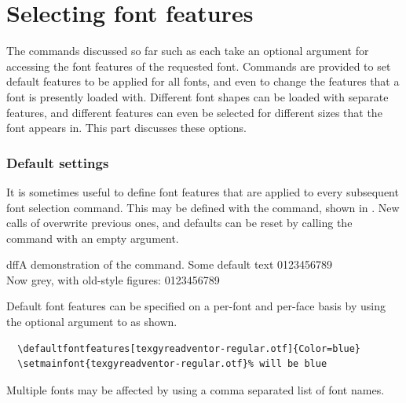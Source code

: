 \documentclass[a4paper]{l3doc}
\begin{document}
\part{Selecting font features}
\label{sec:selectingfeature}

The commands discussed so far such as  each take an optional argument for
accessing the font features of the requested font.
Commands are provided to set default features to be applied for all fonts, and even to change the features that a font is presently loaded with.
Different font shapes can be loaded with separate features, and different features can even be selected for different sizes that the font appears in.
This part discusses these options.

\section{Default settings}
\label{sec:defaults}


It is sometimes useful to define
font features that are applied to every subsequent font selection command.
This may be defined with the
 command, shown in .
New calls of  overwrite previous ones, and defaults can be reset by calling the command with an empty argument.

\begin{Xexample}{dff}{A demonstration of the  command.}
  Some default text 0123456789 \\
  Now grey, with old-style figures:
  0123456789
\end{Xexample}


Default font features can be specified on a per-font and per-face basis
by using the optional argument to  as shown.
\begin{Verbatim}
  \defaultfontfeatures[texgyreadventor-regular.otf]{Color=blue}
  \setmainfont{texgyreadventor-regular.otf}% will be blue
\end{Verbatim}
Multiple fonts may be affected by using a comma separated list of font names.

\end{document}
